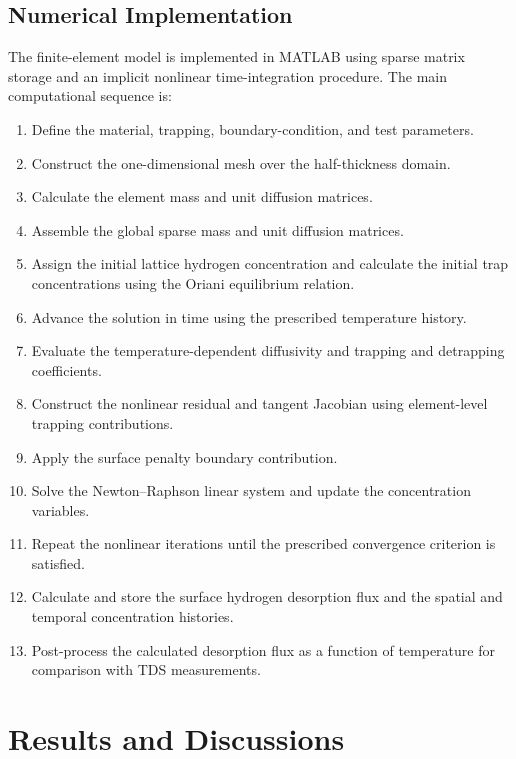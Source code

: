 \documentclass[a4paper,12pt,oneside]{report}
\begin{document}
\section{Numerical Implementation}
\label{sec:ch3_implementation}

The finite-element model is implemented in MATLAB using sparse matrix storage and an implicit nonlinear time-integration procedure. The main computational sequence is:

\begin{enumerate}
\item Define the material, trapping, boundary-condition, and test parameters.
\item Construct the one-dimensional mesh over the half-thickness domain.
\item Calculate the element mass and unit diffusion matrices.
\item Assemble the global sparse mass and unit diffusion matrices.
\item Assign the initial lattice hydrogen concentration and calculate the initial trap concentrations using the Oriani equilibrium relation.
\item Advance the solution in time using the prescribed temperature history.
\item Evaluate the temperature-dependent diffusivity and trapping and detrapping coefficients.
\item Construct the nonlinear residual and tangent Jacobian using element-level trapping contributions.
\item Apply the surface penalty boundary contribution.
\item Solve the Newton--Raphson linear system and update the concentration variables.
\item Repeat the nonlinear iterations until the prescribed convergence criterion is satisfied.
\item Calculate and store the surface hydrogen desorption flux and the spatial and temporal concentration histories.
\item Post-process the calculated desorption flux as a function of temperature for comparison with TDS measurements.
\end{enumerate}

\chapter{Results and Discussions}
\label{ch:results}
\end{document}
